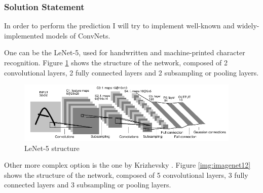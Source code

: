 \documentclass[]{article}
\begin{document}
\subsubsection{Solution Statement}\label{solution-statement}

In order to perform the prediction I will try to implement well-known and widely-implemented models of ConvNets.

One can be the LeNet-5, used for handwritten and machine-printed character recognition. Figure \ref{img:lenet5} shows the structure of the network, composed of 2 convolutional layers, 2 fully connected layers and 2 subsampling or pooling layers.
\begin{figure}[htpb!]
\centering
\includegraphics[width= 0.95\textwidth]{images/lenet5}
\caption{LeNet-5 structure \cite{Lecun98} \label{img:lenet5}}
\end{figure}

Other more complex option is the one by Krizhevsky \cite{Krizhevsky12}. Figure \ref{img:imagenet12} shows the structure of the network, composed of 5 convolutional layers, 3 fully connected layers and 3 subsampling or pooling layers.
\end{document}
